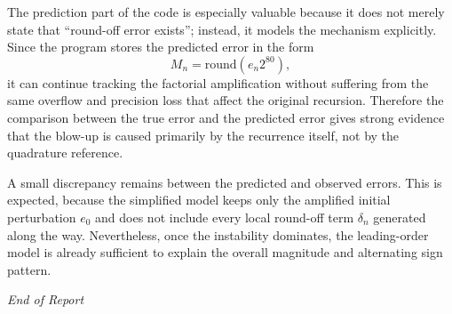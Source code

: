 \documentclass[12pt,a4paper]{article}
\begin{document}
The prediction part of the code is especially valuable because it does not merely state that ``round-off error exists''; instead, it models the mechanism explicitly. Since the program stores the predicted error in the form
\begin{equation}
    M_n = \mathrm{round}(e_n 2^{80}),
\end{equation}
it can continue tracking the factorial amplification without suffering from the same overflow and precision loss that affect the original recursion. Therefore the comparison between the true error and the predicted error gives strong evidence that the blow-up is caused primarily by the recurrence itself, not by the quadrature reference.

A small discrepancy remains between the predicted and observed errors. This is expected, because the simplified model keeps only the amplified initial perturbation $e_0$ and does not include every local round-off term $\delta_n$ generated along the way. Nevertheless, once the instability dominates, the leading-order model is already sufficient to explain the overall magnitude and alternating sign pattern.

\vfill
\begin{center}
    \textit{End of Report}
\end{center}
\end{document}
